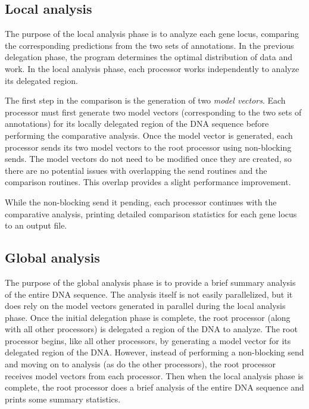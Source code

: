 \documentclass{bioinfo}
\begin{document}
\begin{methods}
\subsection*{Local analysis}
The purpose of the local analysis phase is to analyze each gene locus, comparing the corresponding predictions from the two sets of annotations. In the previous delegation phase, the program determines the optimal distribution of data and work. In the local analysis phase, each processor works independently to analyze its delegated region.

The first step in the comparison is the generation of two \textit{model vectors}. Each processor must first generate two model vectors (corresponding to the two sets of annotations) for its locally delegated region of the DNA sequence before performing the comparative analysis. Once the model vector is generated, each processor sends its two model vectors to the root processor using non-blocking sends. The model vectors do not need to be modified once they are created, so there are no potential issues with overlapping the send routines and the comparison routines. This overlap provides a slight performance improvement.

While the non-blocking send it pending, each processor continues with the comparative analysis, printing detailed comparison statistics for each gene locus to an output file.

\subsection*{Global analysis}
The purpose of the global analysis phase is to provide a brief summary analysis of the entire DNA sequence. The analysis itself is not easily parallelized, but it does rely on the model vectors generated in parallel during the local analysis phase. Once the initial delegation phase is complete, the root processor (along with all other processors) is delegated a region of the DNA to analyze. The root processor begins, like all other processors, by generating a model vector for its delegated region of the DNA. However, instead of performing a non-blocking send and moving on to analysis (as do the other processors), the root processor receives model vectors from each processor. Then when the local analysis phase is complete, the root processor does a brief analysis of the entire DNA sequence and prints some summary statistics.


\end{methods}
\end{document}
